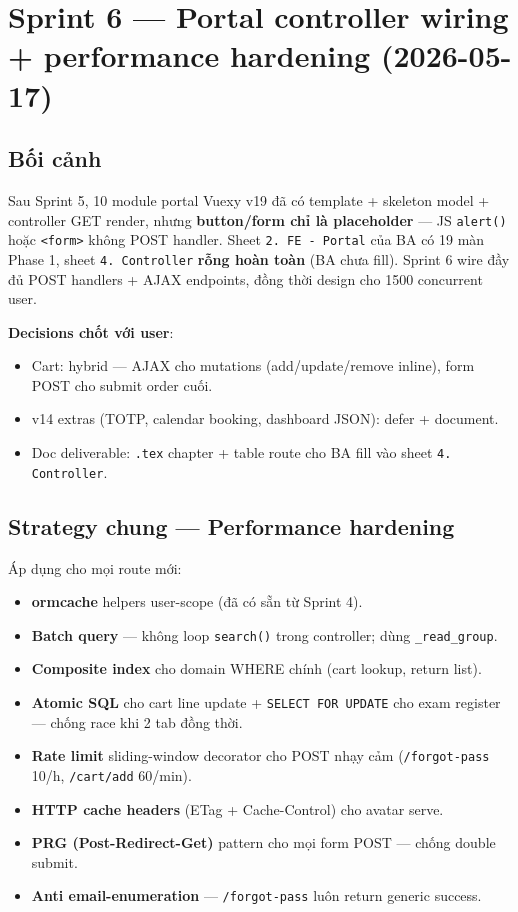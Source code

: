 \chapter{Sprint 6 --- Portal controller wiring + performance hardening (2026-05-17)}

\section{Bối cảnh}

Sau Sprint 5, 10 module portal Vuexy v19 đã có template + skeleton model + controller GET render, nhưng \textbf{button/form chỉ là placeholder} --- JS \texttt{alert()} hoặc \texttt{<form>} không POST handler. Sheet \texttt{2. FE - Portal} của BA có 19 màn Phase 1, sheet \texttt{4. Controller} \textbf{rỗng hoàn toàn} (BA chưa fill). Sprint 6 wire đầy đủ POST handlers + AJAX endpoints, đồng thời design cho 1500 concurrent user.

\textbf{Decisions chốt với user}:
\begin{itemize}[leftmargin=*]
    \item Cart: hybrid --- AJAX cho mutations (add/update/remove inline), form POST cho submit order cuối.
    \item v14 extras (TOTP, calendar booking, dashboard JSON): defer + document.
    \item Doc deliverable: \texttt{.tex} chapter + table route cho BA fill vào sheet \texttt{4. Controller}.
\end{itemize}

\section{Strategy chung --- Performance hardening}

Áp dụng cho mọi route mới:

\begin{itemize}[leftmargin=*]
    \item \textbf{ormcache} helpers user-scope (đã có sẵn từ Sprint 4).
    \item \textbf{Batch query} --- không loop \texttt{search()} trong controller; dùng \texttt{\_read\_group}.
    \item \textbf{Composite index} cho domain WHERE chính (cart lookup, return list).
    \item \textbf{Atomic SQL} cho cart line update + \texttt{SELECT FOR UPDATE} cho exam register --- chống race khi 2 tab đồng thời.
    \item \textbf{Rate limit} sliding-window decorator cho POST nhạy cảm (\texttt{/forgot-pass} 10/h, \texttt{/cart/add} 60/min).
    \item \textbf{HTTP cache headers} (ETag + Cache-Control) cho avatar serve.
    \item \textbf{PRG (Post-Redirect-Get)} pattern cho mọi form POST --- chống double submit.
    \item \textbf{Anti email-enumeration} --- \texttt{/forgot-pass} luôn return generic success.
\end{itemize}


